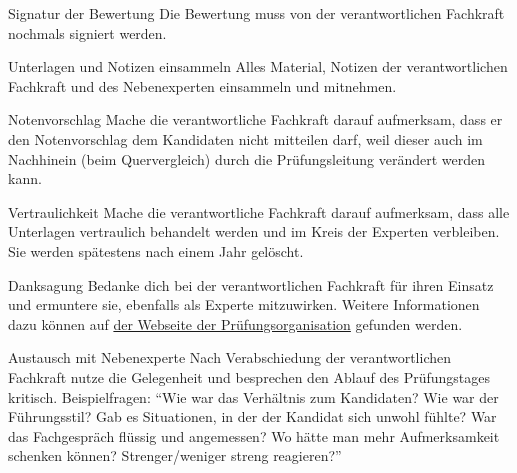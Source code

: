 \begin{taskitemwithoutcomment}{Signatur der Bewertung}
  Die Bewertung muss von der verantwortlichen Fachkraft nochmals signiert werden.
\end{taskitemwithoutcomment}
\begin{taskitemwithoutcomment}{Unterlagen und Notizen einsammeln}
  Alles Material, Notizen der verantwortlichen Fachkraft und des Nebenexperten einsammeln und mitnehmen.
\end{taskitemwithoutcomment}
\begin{taskitemwithoutcomment}{Notenvorschlag}
  Mache die verantwortliche Fachkraft darauf aufmerksam, dass er den Notenvorschlag dem Kandidaten nicht mitteilen darf, weil dieser auch im Nachhinein (beim Quervergleich) durch die Prüfungsleitung verändert werden kann.
\end{taskitemwithoutcomment}
\begin{taskitemwithoutcomment}{Vertraulichkeit}
  Mache die verantwortliche Fachkraft darauf aufmerksam, dass alle Unterlagen vertraulich behandelt werden und im Kreis der Experten verbleiben. Sie werden spätestens nach einem Jahr gelöscht.
\end{taskitemwithoutcomment}
\begin{taskitemwithoutcomment}{Danksagung}
  Bedanke dich bei der verantwortlichen Fachkraft für ihren Einsatz und ermuntere sie, ebenfalls als Experte mitzuwirken. Weitere Informationen dazu können auf \href{https://pk19.ch}{der Webseite der Prüfungsorganisation} gefunden werden.
\end{taskitemwithoutcomment}
\begin{taskitem}{Austausch mit Nebenexperte}
  Nach Verabschiedung der verantwortlichen Fachkraft nutze die Gelegenheit und besprechen den Ablauf des Prüfungstages kritisch. Beispielfragen: \enquote{Wie war das Verhältnis zum Kandidaten? Wie war der Führungsstil? Gab es Situationen, in der der Kandidat sich unwohl fühlte? War das Fachgespräch flüssig und angemessen? Wo hätte man mehr Aufmerksamkeit schenken können? Strenger/weniger streng reagieren?}
\end{taskitem}
